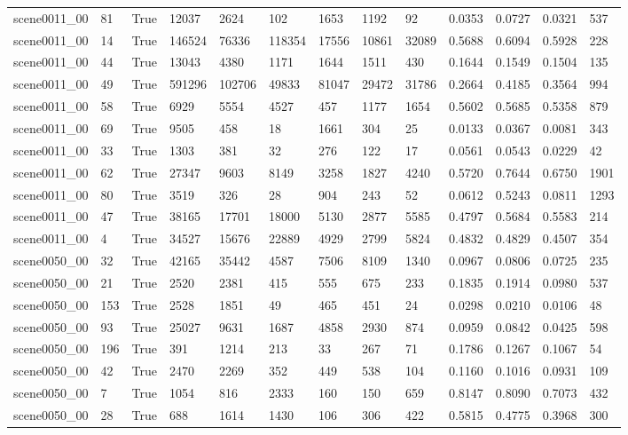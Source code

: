 \begin{tabular}{lllllllllllll}
scene0011\_00 & 81 & True & 12037 & 2624 & 102 & 1653 & 1192 & 92 & 0.0353 & 0.0727 & 0.0321 & 537 \\
scene0011\_00 & 14 & True & 146524 & 76336 & 118354 & 17556 & 10861 & 32089 & 0.5688 & 0.6094 & 0.5928 & 228 \\
scene0011\_00 & 44 & True & 13043 & 4380 & 1171 & 1644 & 1511 & 430 & 0.1644 & 0.1549 & 0.1504 & 135 \\
scene0011\_00 & 49 & True & 591296 & 102706 & 49833 & 81047 & 29472 & 31786 & 0.2664 & 0.4185 & 0.3564 & 994 \\
scene0011\_00 & 58 & True & 6929 & 5554 & 4527 & 457 & 1177 & 1654 & 0.5602 & 0.5685 & 0.5358 & 879 \\
scene0011\_00 & 69 & True & 9505 & 458 & 18 & 1661 & 304 & 25 & 0.0133 & 0.0367 & 0.0081 & 343 \\
scene0011\_00 & 33 & True & 1303 & 381 & 32 & 276 & 122 & 17 & 0.0561 & 0.0543 & 0.0229 & 42 \\
scene0011\_00 & 62 & True & 27347 & 9603 & 8149 & 3258 & 1827 & 4240 & 0.5720 & 0.7644 & 0.6750 & 1901 \\
scene0011\_00 & 80 & True & 3519 & 326 & 28 & 904 & 243 & 52 & 0.0612 & 0.5243 & 0.0811 & 1293 \\
scene0011\_00 & 47 & True & 38165 & 17701 & 18000 & 5130 & 2877 & 5585 & 0.4797 & 0.5684 & 0.5583 & 214 \\
scene0011\_00 & 4 & True & 34527 & 15676 & 22889 & 4929 & 2799 & 5824 & 0.4832 & 0.4829 & 0.4507 & 354 \\
scene0050\_00 & 32 & True & 42165 & 35442 & 4587 & 7506 & 8109 & 1340 & 0.0967 & 0.0806 & 0.0725 & 235 \\
scene0050\_00 & 21 & True & 2520 & 2381 & 415 & 555 & 675 & 233 & 0.1835 & 0.1914 & 0.0980 & 537 \\
scene0050\_00 & 153 & True & 2528 & 1851 & 49 & 465 & 451 & 24 & 0.0298 & 0.0210 & 0.0106 & 48 \\
scene0050\_00 & 93 & True & 25027 & 9631 & 1687 & 4858 & 2930 & 874 & 0.0959 & 0.0842 & 0.0425 & 598 \\
scene0050\_00 & 196 & True & 391 & 1214 & 213 & 33 & 267 & 71 & 0.1786 & 0.1267 & 0.1067 & 54 \\
scene0050\_00 & 42 & True & 2470 & 2269 & 352 & 449 & 538 & 104 & 0.1160 & 0.1016 & 0.0931 & 109 \\
scene0050\_00 & 7 & True & 1054 & 816 & 2333 & 160 & 150 & 659 & 0.8147 & 0.8090 & 0.7073 & 432 \\
scene0050\_00 & 28 & True & 688 & 1614 & 1430 & 106 & 306 & 422 & 0.5815 & 0.4775 & 0.3968 & 300 \\

\end{tabular}
